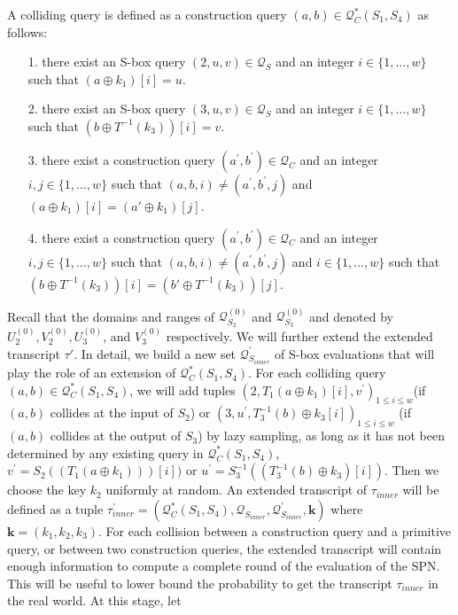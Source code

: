A colliding query is defined as a construction query $(a, b) \in \mathcal{Q}_{C}^{*}\left(S_{1}, S_{4}\right)$ as follows:
%
\begin{itemize}
	\item[1.]
	there exist an S-box query $(2, u, v) \in \mathcal{Q}_{S}$ and an integer $i \in\{1, \ldots, w\}$ such that $\left(a \oplus k_1\right)[i]=u$.
	\item[2.]
	there exist an S-box query $(3, u, v) \in \mathcal{Q}_{S}$ and an integer $i \in\{1, \ldots, w\}$ such that $\left(b \oplus T^{-1}(k_3)\right)[i]=v$.
	\item[3.] there exist a construction query $\left(a^{\prime}, b^{\prime}\right) \in \mathcal{Q}_{C}$ and an integer $i,j \in\{1, \ldots, w\}$ such that $(a, b, i) \neq\left(a^{\prime}, b^{\prime}, j\right)$ and $\left(a \oplus k_1\right)[i] = \left(a' \oplus k_1\right)[j]$.
	\item[4.] there exist a construction query $\left(a^{\prime}, b^{\prime}\right) \in \mathcal{Q}_{C}$ and an integer $i,j \in\{1, \ldots, w\}$ such that $(a, b, i) \neq\left(a^{\prime}, b^{\prime}, j\right)$ and $i \in\{1, \ldots, w\}$ such that $\left(b \oplus T^{-1}(k_3)\right)[i] = \left(b' \oplus T^{-1}(k_3)\right)[j]$.
\end{itemize}
%
%
Recall that the domains and ranges of $\mathcal{Q}_{S_{2}}^{(0)}$ and $\mathcal{Q}_{S_{3}}^{(0)}$ and denoted by $U_{2}^{(0)},V_{2}^{(0)},U_{3}^{(0)}$, and $V_{3}^{(0)}$ respectively. We will further extend the extended transcript $\tau'$. In detail, we build a new set $\mathcal{Q}_{S_{inner}}^{\prime}$ of S-box evaluations that will play the role of an extension of $\mathcal{Q}_{C}^{*}\left(S_{1}, S_{4}\right)$. For each colliding query $(a, b) \in \mathcal{Q}_{C}^{*}\left(S_{1}, S_{4}\right)$, we will add tuples $\left(2, T_1\left(a \oplus k_{1}\right)[i], v^{\prime}\right)_{1 \leq i \leq w}$(if $(a, b)$ collides at the input of $S_2$) or $\left(3, u^{\prime}, T_{3}^{-1}\left(b\right) \oplus k_{3}[i]\right)_{1 \leq i \leq w}$ (if $(a, b)$ collides at the output of $S_3$) by lazy sampling, as long as it has not been determined by any existing query in $\mathcal{Q}_{C}^{*}\left(S_{1}, S_{4}\right)$, $v^{\prime}=S_{2}(\left(T_1\left(a \oplus k_{1}\right)\right))[i])$ or $u^{\prime}=S_{3}^{-1}(\left(T_{3}^{-1}\left(b\right) \oplus k_{3}\right)[i])$. Then we choose the key $k_2$ uniformly at random. An extended transcript of $\tau_{inner}$ will be defined as a tuple $\tau_{inner}^{\prime}=\left(\mathcal{Q}_{C}^{*}\left(S_{1}, S_{4}\right), \mathcal{Q}_{S_{inner}}, \mathcal{Q}_{S_{inner}}^{\prime}, \mathbf{k}\right)$ where $\mathbf{k}=\left(k_{1}, k_{2}, k_{3}\right)$. For each collision between a construction query and a primitive query, or between two construction queries, the extended transcript will contain enough information to compute a complete round of the evaluation of the SPN. This will be useful to lower bound the probability to get the transcript $\tau_{inner}$ in the real world. At this stage, let
